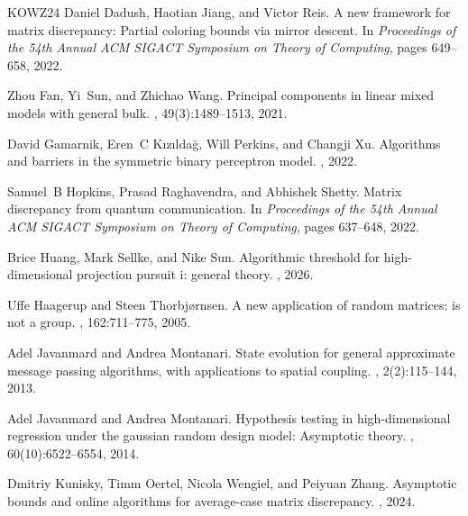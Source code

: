 \documentclass[11pt]{article}
\theoremstyle{definition}
\theoremstyle{remark}
\numberwithin{equation}{section}
\numberwithin{theorem}{section}
\begin{document}
\begin{thebibliography}{KOWZ24}
Daniel Dadush, Haotian Jiang, and Victor Reis.
\newblock A new framework for matrix discrepancy: Partial coloring bounds via mirror descent.
\newblock In {\em Proceedings of the 54th Annual ACM SIGACT Symposium on Theory of Computing}, pages 649--658, 2022.

Zhou Fan, Yi~Sun, and Zhichao Wang.
\newblock Principal components in linear mixed models with general bulk.
, 49(3):1489--1513, 2021.

David Gamarnik, Eren~C K{\i}z{\i}lda{\u{g}}, Will Perkins, and Changji Xu.
\newblock Algorithms and barriers in the symmetric binary perceptron model.
, 2022.

Samuel~B Hopkins, Prasad Raghavendra, and Abhishek Shetty.
\newblock Matrix discrepancy from quantum communication.
\newblock In {\em Proceedings of the 54th Annual ACM SIGACT Symposium on Theory of Computing}, pages 637--648, 2022.

Brice Huang, Mark Sellke, and Nike Sun.
\newblock Algorithmic threshold for high-dimensional projection pursuit i: general theory.
, 2026.

Uffe Haagerup and Steen Thorbj{\o}rnsen.
\newblock A new application of random matrices: is not a group.
, 162:711--775, 2005.

Adel Javanmard and Andrea Montanari.
\newblock State evolution for general approximate message passing algorithms, with applications to spatial coupling.
, 2(2):115--144, 2013.

Adel Javanmard and Andrea Montanari.
\newblock Hypothesis testing in high-dimensional regression under the gaussian random design model: Asymptotic theory.
, 60(10):6522--6554, 2014.

Dmitriy Kunisky, Timm Oertel, Nicola Wengiel, and Peiyuan Zhang.
\newblock Asymptotic bounds and online algorithms for average-case matrix discrepancy.
, 2024.


\end{thebibliography}
\end{document}
